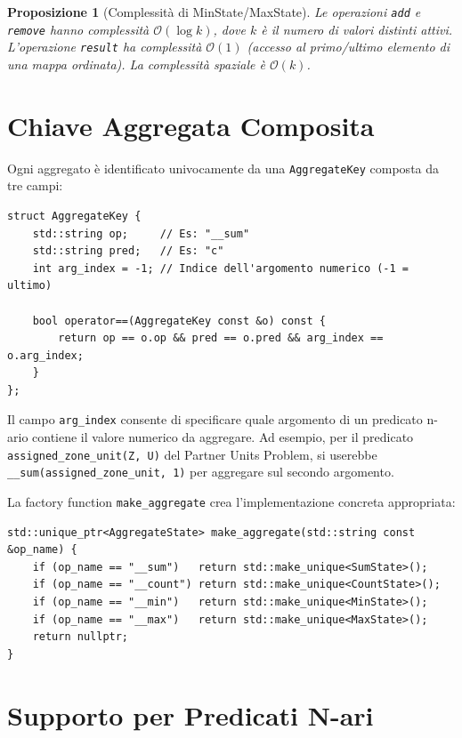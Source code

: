 \documentclass[a4paper,12pt,twoside,openright]{report}
\newtheorem{proposition}{Proposizione}[chapter]
\begin{document}
\begin{proposition}[Complessit\`{a} di MinState/MaxState]
Le operazioni \texttt{add} e \texttt{remove} hanno complessit\`{a} $\mathcal{O}(\log k)$, dove $k$ \`{e} il numero di valori distinti attivi. L'operazione \texttt{result} ha complessit\`{a} $\mathcal{O}(1)$ (accesso al primo/ultimo elemento di una mappa ordinata). La complessit\`{a} spaziale \`{e} $\mathcal{O}(k)$.
\end{proposition}

\section{Chiave Aggregata Composita}

Ogni aggregato \`{e} identificato univocamente da una \texttt{AggregateKey} composta da tre campi:

\begin{lstlisting}[style=cppstyle,caption={Struttura \texttt{AggregateKey}}]
struct AggregateKey {
    std::string op;     // Es: "__sum"
    std::string pred;   // Es: "c"
    int arg_index = -1; // Indice dell'argomento numerico (-1 = ultimo)

    bool operator==(AggregateKey const &o) const {
        return op == o.op && pred == o.pred && arg_index == o.arg_index;
    }
};
\end{lstlisting}

Il campo \texttt{arg\_index} consente di specificare quale argomento di un predicato n-ario contiene il valore numerico da aggregare. Ad esempio, per il predicato \texttt{assigned\_zone\_unit(Z, U)} del Partner Units Problem, si userebbe \texttt{\_\_sum(assigned\_zone\_unit, 1)} per aggregare sul secondo argomento.

La factory function \texttt{make\_aggregate} crea l'implementazione concreta appropriata:

\begin{lstlisting}[style=cppstyle,caption={Factory function per gli aggregati}]
std::unique_ptr<AggregateState> make_aggregate(std::string const &op_name) {
    if (op_name == "__sum")   return std::make_unique<SumState>();
    if (op_name == "__count") return std::make_unique<CountState>();
    if (op_name == "__min")   return std::make_unique<MinState>();
    if (op_name == "__max")   return std::make_unique<MaxState>();
    return nullptr;
}
\end{lstlisting}

\section{Supporto per Predicati N-ari}
\end{document}
